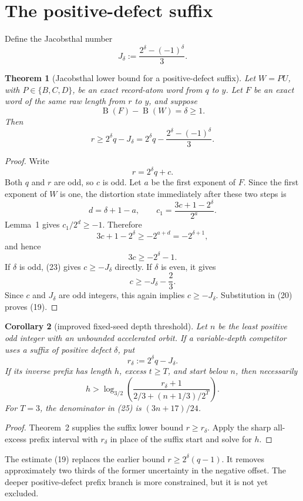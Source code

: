 \documentclass[11pt]{article}
\newtheorem{theorem}{Theorem}
\newtheorem{corollary}[theorem]{Corollary}
\newcommand{\mass}{\operatorname{B}}
\begin{document}
\section{The positive-defect suffix}

Define the Jacobsthal number
\[
 J_\delta:=\frac{2^\delta-(-1)^\delta}{3}.
 \tag{17}
\]

\begin{theorem}[Jacobsthal lower bound for a positive-defect suffix]
Let \(W=PU\), with \(P\in\{B,C,D\}\), be an exact record-atom word
from \(q\) to \(y\).  Let \(F\) be an exact word of the same raw length
from \(r\) to \(y\), and suppose
\[
 \mass(F)-\mass(W)=\delta\geq1.
 \tag{18}
\]
Then
\[
 \boxed{
 r\geq2^\delta q-J_\delta
 =
 2^\delta q-\frac{2^\delta-(-1)^\delta}{3}.}
 \tag{19}
\]
\end{theorem}

\begin{proof}
Write
\[
 r=2^\delta q+c.
 \tag{20}
\]
Both \(q\) and \(r\) are odd, so \(c\) is odd.  Let \(a\) be the first
exponent of \(F\).  Since the first exponent of \(W\) is one, the
distortion state immediately after these two steps is
\[
 d=\delta+1-a,
 \qquad
 c_1=\frac{3c+1-2^\delta}{2^a}.
 \tag{21}
\]
Lemma~1 gives \(c_1/2^d\geq-1\).  Therefore
\[
 3c+1-2^\delta\geq-2^{a+d}=-2^{\delta+1},
 \tag{22}
\]
and hence
\[
 3c\geq-2^\delta-1.
 \tag{23}
\]
If \(\delta\) is odd, (23) gives \(c\geq-J_\delta\) directly.  If
\(\delta\) is even, it gives
\[
 c\geq-J_\delta-\frac23.
 \]
Since \(c\) and \(J_\delta\) are odd integers, this again implies
\(c\geq-J_\delta\).  Substitution in (20) proves (19).
\end{proof}

\begin{corollary}[improved fixed-seed depth threshold]
Let \(n\) be the least positive odd integer with an unbounded
accelerated orbit.  If a variable-depth competitor uses a suffix of
positive defect \(\delta\), put
\[
 r_\delta:=2^\delta q-J_\delta.
 \tag{24}
\]
If its inverse prefix has length \(h\), excess \(t\geq T\), and start
below \(n\), then necessarily
\[
 \boxed{
 h>
 \log_{3/2}\left(
 \frac{r_\delta+1}
 {\displaystyle 2/3+(n+1/3)/2^T}
 \right).}
 \tag{25}
\]
For \(T=3\), the denominator in (25) is
\((3n+17)/24\).
\end{corollary}

\begin{proof}
Theorem~2 supplies the suffix lower bound \(r\geq r_\delta\).  Apply
the sharp all-excess prefix interval with \(r_\delta\) in place of the
suffix start and solve for \(h\).
\end{proof}

The estimate (19) replaces the earlier bound \(r\geq2^\delta(q-1)\).
It removes approximately two thirds of the former uncertainty in the
negative offset.  The deeper positive-defect prefix branch is more
constrained, but it is not yet excluded.
\end{document}
